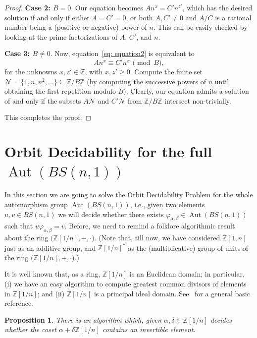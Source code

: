 \documentclass[english]{amsart}
\newtheorem{prop}[thm]{Proposition}
\theoremstyle{definition}
\newcommand\ZZ{\mathbb{Z}}
\newcommand{\Aut}{\operatorname{Aut}}
\begin{document}
\begin{proof}
\textbf{Case 2: $B=0$}. Our equation becomes $An^x=C' n^{z'}$, which has the desired solution if and only if either $A=C'=0$, or both $A,C'\neq 0$ and $A/C$ is a rational number being a (positive or negative) power of $n$. This can be easily checked by looking at the prime factorizations of $A$, $C'$, and $n$.

\textbf{Case 3: $B\neq 0$}. Now, equation~\eqref{eq: equation2} is equivalent to 
 $$
An^x \equiv C'n^{z'} \pmod{B},
 $$
for the unknowns $x,z'\in \ZZ$, with $x,z'\geq 0$. Compute the finite set $\mathcal{N}=\{1,n,n^2, \ldots \}\subseteq \ZZ/B\ZZ$ (by computing the successive powers of $n$ until obtaining the first repetition modulo $B$). Clearly, our equation admits a solution of and only if the subsets $A\mathcal{N}$ and $C'\mathcal{N}$ from $\ZZ/B\ZZ$ intersect non-trivially. 

This completes the proof.
\end{proof}


\section{Orbit Decidability for the full $\Aut(BS(n,1))$}\label{sec: OD}

In this section we are going to solve the Orbit Decidability Problem for the whole automorphism group $\Aut(BS(n,1))$, i.e., given two elements $u,v \in BS(n,1)$ we will decide whether there exists $\varphi_{\alpha, \beta} \in \Aut(BS(n,1))$ such that $u\varphi_{\alpha, \beta}=v$. Before, we need to remind a folklore algorithmic result about the ring $\big( \ZZ[1/n], +, \cdot \big)$. (Note that, till now, we have considered $\ZZ[1,n]$ just as an additive group, and $\ZZ[1/n]^*$ as the (multiplicative) group of units of the ring $\big( \ZZ[1/n], +, \cdot \big)$.) 

It is well known that, as a ring, $\ZZ[1/n]$ is an Euclidean domain; in particular, (i) we have an easy algorithm to compute greatest common divisors of elements in $\ZZ[1/n]$; and (ii) $\ZZ[1/n]$ is a principal ideal domain. See~\cite{Dummit-Foote} for a general basic reference. 

\begin{prop}\label{prop: coset of ideal}
There is an algorithm which, given $\alpha, \delta\in \ZZ[1/n]$ decides whether the coset $\alpha +\delta\ZZ[1/n]$ contains an invertible element. 
\end{prop}
\end{document}

